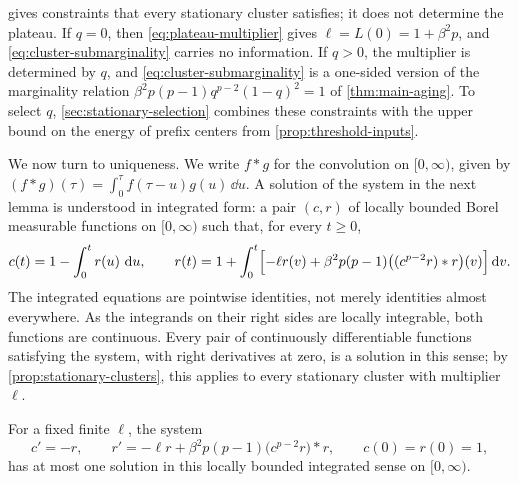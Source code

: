  gives constraints that every stationary cluster satisfies; it does not determine the plateau. If $q=0$, then \eqref{eq:plateau-multiplier} gives $\ell=L(0)=1+\beta^2p$, and \eqref{eq:cluster-submarginality} carries no information. If $q>0$, the multiplier is determined by $q$, and \eqref{eq:cluster-submarginality} is a one-sided version of the marginality relation $\beta^2p(p-1)q^{p-2}(1-q)^2=1$ of \cref{thm:main-aging}. To select $q$, \cref{sec:stationary-selection} combines these constraints with the upper bound on the energy of prefix centers from \cref{prop:threshold-inputs}.

We now turn to uniqueness. We write $f*g$ for the convolution on $[0,\infty)$, given by $(f*g)(\tau)=\int_0^\tau f(\tau-u)g(u)\,\dd u$. A solution of the system in the next lemma is understood in integrated form: a pair $(c,r)$ of locally bounded Borel measurable functions on $[0,\infty)$ such that, for every $t\ge0$,
\[
 c(t)=1-\int_0^tr(u)\,\mathop{}\!\mathrm d u,
 \qquad
 r(t)=1+\int_0^t\Bigl[-\ell r(v)+\beta^2p(p-1)\bigl((c^{p-2}r)*r\bigr)(v)\Bigr]\mathop{}\!\mathrm d v.
\]
The integrated equations are pointwise identities, not merely identities almost everywhere. As the integrands on their right sides are locally integrable, both functions are continuous. Every pair of continuously differentiable functions satisfying the system, with right derivatives at zero, is a solution in this sense; by \cref{prop:stationary-clusters}, this applies to every stationary cluster with multiplier $\ell$.

\begin{lemma}\label{lem:stationary-uniqueness}
For a fixed finite $\ell$, the system
\[
 c'=-r,\qquad
 r'=-\ell r+\beta^2p(p-1)\bigl(c^{p-2}r\bigr)*r,
 \qquad c(0)=r(0)=1,
\]
has at most one solution in this locally bounded integrated sense on $[0,\infty)$.
\end{lemma}

